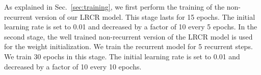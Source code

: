 \documentclass[10pt,twocolumn,letterpaper]{article}
\begin{document}
 As explained in Sec.~\ref{sec:training}, we first perform the training of the non-recurrent version of our LRCR model. This stage lasts for 15 epochs. The initial learning rate is set to 0.01 and decreased by a factor of 10 every 5 epochs. In the second stage, the well trained non-recurrent version of the LRCR model is used for the weight initialization. We train the recurrent model for 5 recurrent steps. We train 30 epochs in this stage. The initial learning rate is set to 0.01 and decreased by a factor of 10 every 10 epochs. 
\begin{figure*}
	\captionsetup[subfigure]{labelformat=empty}
	\centering
	\hspace{-0.2cm}
	\vspace{-0cm}
	\hspace{0cm}
	\hspace{0cm}
	\\
	\vspace{-0.7cm}
	\hspace{-0.2cm}
	\hspace{0cm}
	\hspace{0cm}
	\\	
	\vspace{-0.7cm}
	\hspace{-0.2cm}
	\hspace{0cm}
	\hspace{0cm}
	\\

\end{figure*}
\end{document}
